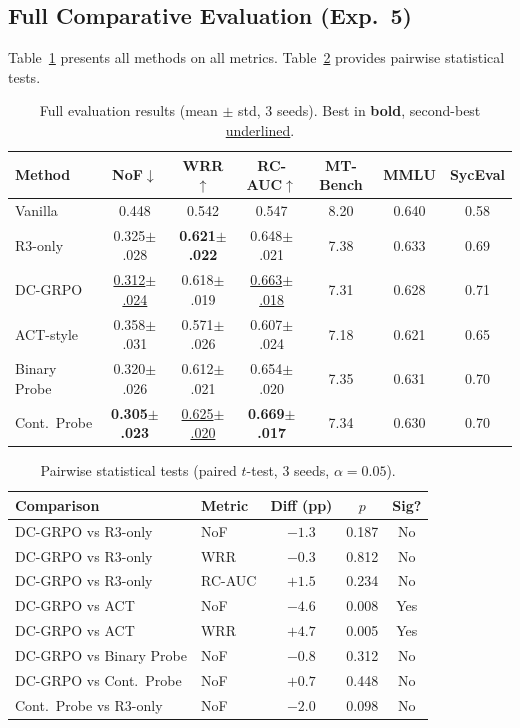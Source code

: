 \documentclass[11pt,a4paper]{article}
\begin{document}
\subsection{Full Comparative Evaluation (Exp.\ 5)}
\label{sec:exp5}

Table~\ref{tab:full_eval} presents all methods on all metrics. Table~\ref{tab:stat_tests} provides pairwise statistical tests.

\begin{table}[h]
\centering
\small
\caption{Full evaluation results (mean $\pm$ std, 3 seeds). Best in \textbf{bold}, second-best \underline{underlined}.}
\label{tab:full_eval}
\begin{tabular}{lcccccc}
\toprule
Method & NoF$\downarrow$ & WRR$\uparrow$ & RC-AUC$\uparrow$ & MT-Bench & MMLU & SycEval \\
\midrule
Vanilla         & 0.448          & 0.542          & 0.547          & 8.20 & 0.640 & 0.58 \\
R3-only         & 0.325$\pm$.028 & \textbf{0.621$\pm$.022} & 0.648$\pm$.021 & 7.38 & 0.633 & 0.69 \\
DC-GRPO         & \underline{0.312$\pm$.024} & 0.618$\pm$.019 & \underline{0.663$\pm$.018} & 7.31 & 0.628 & 0.71 \\
ACT-style       & 0.358$\pm$.031 & 0.571$\pm$.026 & 0.607$\pm$.024 & 7.18 & 0.621 & 0.65 \\
Binary Probe    & 0.320$\pm$.026 & 0.612$\pm$.021 & 0.654$\pm$.020 & 7.35 & 0.631 & 0.70 \\
Cont.\ Probe   & \textbf{0.305$\pm$.023} & \underline{0.625$\pm$.020} & \textbf{0.669$\pm$.017} & 7.34 & 0.630 & 0.70 \\
\bottomrule
\end{tabular}
\end{table}

\begin{table}[h]
\centering
\small
\caption{Pairwise statistical tests (paired $t$-test, 3 seeds, $\alpha = 0.05$).}
\label{tab:stat_tests}
\begin{tabular}{llccc}
\toprule
Comparison & Metric & Diff (pp) & $p$ & Sig? \\
\midrule
DC-GRPO vs R3-only         & NoF    & $-1.3$  & 0.187 & No  \\
DC-GRPO vs R3-only         & WRR    & $-0.3$  & 0.812 & No  \\
DC-GRPO vs R3-only         & RC-AUC & $+1.5$  & 0.234 & No  \\
DC-GRPO vs ACT             & NoF    & $-4.6$  & 0.008 & Yes \\
DC-GRPO vs ACT             & WRR    & $+4.7$  & 0.005 & Yes \\
DC-GRPO vs Binary Probe    & NoF    & $-0.8$  & 0.312 & No  \\
DC-GRPO vs Cont.\ Probe    & NoF    & $+0.7$  & 0.448 & No  \\
Cont.\ Probe vs R3-only    & NoF    & $-2.0$  & 0.098 & No  \\
\bottomrule
\end{tabular}
\end{table}
\end{document}
